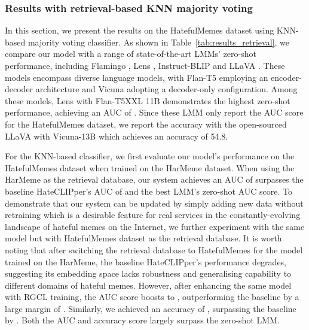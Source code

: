 \documentclass[11pt]{article}
\begin{document}
\subsubsection{Results with retrieval-based KNN majority voting}
\label{sec:results_knn}
In this section, we present the results on the HatefulMemes dataset using KNN-based majority voting classifier. As shown in Table~\ref{tab:results_retrieval}, we compare our model with a range of state-of-the-art LMMs' zero-shot performance, including Flamingo \cite{Flamingo22}, Lens \cite{BerriosLens2023}, Instruct-BLIP \cite{Ouyang_InstructGPT_2022} and LLaVA \cite{LiuLLAVA2023}. These models encompass diverse language models, with Flan-T5 \cite{Chung_FLAN_2022} employing an encoder-decoder architecture and Vicuna \cite{vicuna2023} adopting a decoder-only configuration. Among these models, Lens with Flan-T5XXL 11B demonstrates the highest zero-shot performance, achieving an AUC of . 
Since these LMM only report the AUC score for the HatefulMemes dataset, we report the accuracy with the open-sourced LLaVA with Vicuna-13B which achieves an accuracy of 54.8. 

For the KNN-based classifier, we first evaluate our model's performance on the HatefulMemes dataset when trained on the HarMeme dataset. When using the HarMeme as the retrieval database, our system achieves an AUC of  surpasses the baseline HateCLIPper's AUC of  and the best LMM's zero-shot AUC score.
To demonstrate that our system can be updated by simply adding new data without retraining which is a desirable feature for real services in the constantly-evolving landscape of hateful memes on the Internet, we further experiment with the same model but with HatefulMemes dataset as the retrieval database. 
It is worth noting that after switching the retrieval database to HatefulMemes for the model trained on the HarMeme, the baseline HateCLIPper's performance degrades, suggesting its embedding space lacks robustness and generalising capability to different domains of hateful memes.
However, after enhancing the same model with RGCL training, the AUC score boosts to , outperforming the baseline by a large margin of . Similarly, we achieved an accuracy of , surpassing the baseline by . Both the AUC and accuracy score largely surpass the zero-shot LMM.
\end{document}
